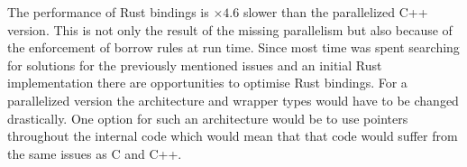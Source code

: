 \documentclass[thesis]{subfiles}
\begin{document}
The performance of Rust bindings is $\times 4.6$ slower than the parallelized C++ version.
This is not only the result of the missing parallelism but also because of the enforcement of borrow rules at run time.
Since most time was spent searching for solutions for the previously mentioned issues and an initial Rust implementation there are opportunities to optimise Rust bindings.
For a parallelized version the architecture and wrapper types would have to be changed drastically.
One option for such an architecture would be to use pointers throughout the internal code which would mean that that code would suffer from the same issues as C and C++.
\end{document}
